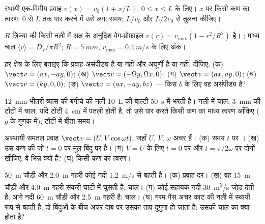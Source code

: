 \begin{exercise}[$\star$]\label{exo:b2:fluid-kinematics:2}
स्थायी एक-विमीय प्रवाह $v(x) = v_0(1 + x/L)$, $0 \le x \le L$ के लिए।
$x$ पर किसी कण का त्वरण; $0$ से $L$ तक पार करने में उसे लगा समय;
$L/v_0$ और $L/2v_0$ से तुलना कीजिए।
\end{exercise}

\begin{exercise}[$\star$]\label{exo:b2:fluid-kinematics:3}
$R$ त्रिज्या की किसी नली में अक्ष के अनुदिश वेग-प्रोफ़ाइल $v(r) = v_{\max}(1 -
r^2/R^2)$ है। ; माध्य चाल $\langle v\rangle
= D_V/\pi R^2$; $R = \qty{5}{mm}$, $v_{\max} = \qty{0.4}{m/s}$ के लिए अंक।
\end{exercise}

\begin{exercise}[$\star$]\label{exo:b2:fluid-kinematics:4}
हर क्षेत्र के लिए बताइए कि प्रवाह असंपीड्य है या नहीं और अघूर्णी है
या नहीं;  दीजिए: (क) $\vect v = (ax, -ay, 0)$; (ख)
$\vect v = (-\Omega y, \Omega x, 0)$; (ग) $\vect v = (ax, ay, 0)$; (घ) $\vect v =
(ky, 0, 0)$; (ङ) $\vect v = (ax, -ay, bz)$ --- किस $b$ के लिए वह
असंपीड्य है?
\end{exercise}

\begin{exercise}[$\star\star$]\label{exo:b2:fluid-kinematics:5}
\qty{12}{mm} भीतरी व्यास की बगीचे की नली \qty{10}{L} की बाल्टी
\qty{50}{s} में भरती है। नली में चाल; \qty{3}{mm} की टोंटी में चाल; यदि
टोंटी \qty{4}{cm} में पतली होती है, तो उसे पार करते किसी
कण का माध्य त्वरण आँकिए ($g$ के गुणक में); टोंटी में बीता समय।
\end{exercise}

\begin{exercise}[$\star\star$]\label{exo:b2:fluid-kinematics:6}
अस्थायी समतल प्रवाह $\vect v = (U, V\cos\omega t)$, जहाँ $U$, $V$, $\omega$
अचर हैं। (क) समय $t$ पर । (ख) उस कण की  जो
$t = 0$ पर मूल बिंदु पर है। (ग) $V = U$ के लिए $t = 0$ पर और
$t = \pi/2\omega$ पर दोनों खींचिए; वे भिन्न क्यों हैं? (घ) किसी कण का त्वरण।
\end{exercise}

\begin{exercise}[$\star\star$]\label{exo:b2:fluid-kinematics:7}
\qty{50}{m} चौड़ी और \qty{2.0}{m} गहरी कोई नदी \qty{1.2}{m/s} से बहती है। (क)
प्रवाह दर। (ख) वह \qty{15}{m} चौड़ी और \qty{4.0}{m} गहरी संकरी घाटी में घुसती है:
चाल। (ग) कोई सहायक नदी \qty{30}{m^3/s} जोड़ देती है; आगे नदी
\qty{60}{m} चौड़ी और \qty{2.5}{m} गहरी है: चाल। (घ) गरम गैस अचर काट की नली में
स्थायी रूप से बहती है; दो बिंदुओं के बीच अचर दाब पर उसका ताप
दुगुना हो जाता है: उसकी चाल का क्या होता है?
\end{exercise}


